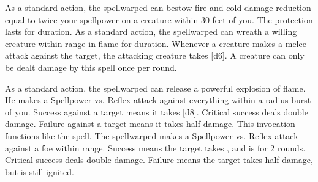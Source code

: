             As a standard action, the spellwarped can bestow fire and cold damage reduction equal to twice your spellpower on a creature within 30 feet of you.
            The protection lasts for \durshort duration.
            As a standard action, the spellwarped can wreath a willing creature within \rngclose range in flame for \durshort duration.
            Whenever a creature makes a melee attack against the target, the attacking creature takes [d6].
            A creature can only be dealt damage by this spell once per round.

            As a standard action, the spellwarped can release a powerful explosion of flame.
            He makes a Spellpower vs. Reflex attack against everything within a \areamed radius burst of you.
            Success against a target means it takes [d8].
            Critical success deals double damage.
            Failure against a target means it takes half damage.
            This invocation functions like the  spell.
            The spellwarped makes a Spellpower vs. Reflex attack against a foe within \rngclose range.
            Success means the target takes , and is \ignited for 2 rounds.
            Critical success deals double damage.
            Failure means the target takes half damage, but is still ignited.

